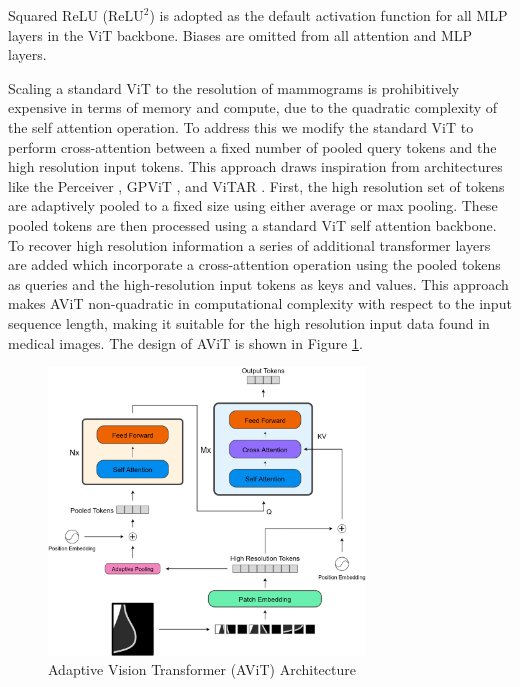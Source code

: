 \documentclass[12pt]{article}
\newcommand{\reluTwo}{$\text{ReLU}^2$}
\begin{document}
Squared ReLU (\reluTwo) \cite{so2022relu2} is adopted as the default activation function for all MLP layers in the ViT backbone. Biases are omitted from all attention and MLP layers.


Scaling a standard ViT to the resolution of mammograms is prohibitively expensive in terms of memory and compute, due to the quadratic complexity of the self attention operation.
To address this we modify the standard ViT to perform cross-attention between a fixed number of pooled query tokens and the high resolution input tokens. This approach draws inspiration
from architectures like the Perceiver \cite{jaegle2021perceiver}, GPViT \cite{yang2023gpvit}, and ViTAR \cite{fan2024vitar}. First, the high resolution set of tokens are adaptively pooled to a
fixed size using either average or max pooling. These pooled tokens are then processed using a standard ViT self attention backbone. To recover high resolution information a series of
additional transformer layers are added which incorporate a cross-attention operation using the pooled tokens as queries and the high-resolution input tokens as keys and values. 
This approach makes AViT non-quadratic in computational complexity with respect to the input sequence length, making it suitable for the high resolution input data found in medical images.
The design of AViT is shown in Figure \ref{fig:avit}.

\begin{figure}[H]
    \centering
    \includegraphics[width=0.75\textwidth]{./figures/avit.png}
    \caption{Adaptive Vision Transformer (AViT) Architecture}
    \label{fig:avit}
\end{figure}
\end{document}
